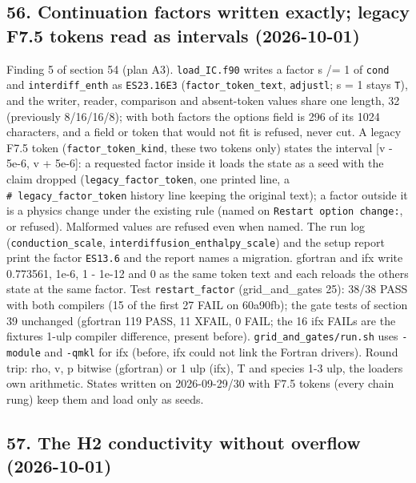 \documentclass[english,a4paper]{my_memo}
\begin{document}
\subsection{56. Continuation factors written exactly; legacy F7.5 tokens read as intervals (2026-10-01)}\label{56-continuation-factors-written-exactly-legacy-f75-tokens-read-as-intervals-2026-10-01}

Finding 5 of section 54 (plan A3). \texttt{load\_IC.f90} writes a factor s /= 1 of
\texttt{cond} and \texttt{interdiff\_enth} as \texttt{ES23.16E3} (\texttt{factor\_token\_text}, \texttt{adjustl};
s = 1 stays \texttt{T}), and the writer, reader, comparison and absent-token values
share one length, 32 (previously 8/16/16/8); with both factors the options
field is 296 of its 1024 characters, and a field or token that would not fit
is refused, never cut. A legacy F7.5 token (\texttt{factor\_token\_kind}, these two
tokens only) states the interval {[}v - 5e-6, v + 5e-6{]}: a requested factor
inside it loads the state as a seed with the claim dropped
(\texttt{legacy\_factor\_token}, one printed line, a \texttt{\#\ legacy\_factor\_token} history
line keeping the original text); a factor outside it is a physics change
under the existing rule (named on \texttt{Restart\ option\ change:}, or refused).
Malformed values are refused even when named. The run log
(\texttt{conduction\_scale}, \texttt{interdiffusion\_enthalpy\_scale}) and the setup report
print the factor \texttt{ES13.6} and the report names a migration. gfortran and
ifx write 0.773561, 1e-6, 1 - 1e-12 and 0 as the same token text and each
reloads the other\textquotesingle s state at the same factor. Test \texttt{restart\_factor}
(grid\_and\_gates 25): 38/38 PASS with both compilers (15 of the first 27
FAIL on 60a90fb); the gate tests of section 39 unchanged (gfortran 119
PASS, 11 XFAIL, 0 FAIL; the 16 ifx FAILs are the fixtures\textquotesingle{} 1-ulp compiler
difference, present before). \texttt{grid\_and\_gates/run.sh} uses \texttt{-module} and
\texttt{-qmkl} for ifx (before, ifx could not link the Fortran drivers). Round
trip: rho, v, p bitwise (gfortran) or 1 ulp (ifx), T and species 1-3 ulp,
the loader\textquotesingle s own arithmetic. States written on 2026-09-29/30 with F7.5
tokens (every chain rung) keep them and load only as seeds.

\subsection{57. The H2 conductivity without overflow (2026-10-01)}\label{57-the-h2-conductivity-without-overflow-2026-10-01}
\end{document}
